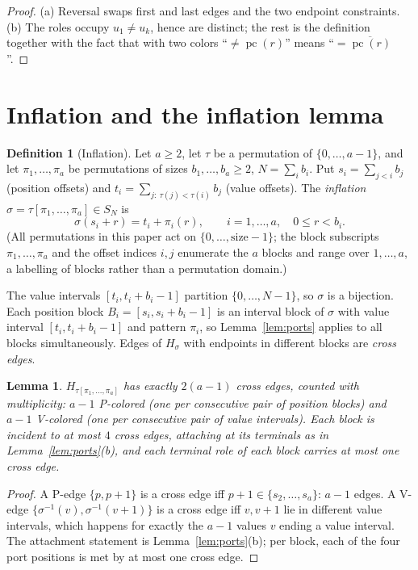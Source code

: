 \documentclass[11pt]{article}
\newtheorem{lemma}[theorem]{Lemma}
\theoremstyle{definition}
\newtheorem{definition}[theorem]{Definition}
\newcommand{\inv}[1]{#1^{-1}}
\DeclareMathOperator{\pc}{pc}
\begin{document}
\begin{proof}
(a) Reversal swaps first and last edges and the two endpoint constraints. (b) The roles
occupy $u_1 \ne u_k$, hence are distinct; the rest is the definition together with the
fact that with two colors ``$\ne\pc(r)$'' means ``$=\overline{\pc(r)}$''.
\end{proof}

\section{Inflation and the inflation lemma}\label{sec:inflation}

\begin{definition}[Inflation]\label{def:inflation}
Let $a \ge 2$, let $\tau$ be a permutation of $\{0, \dots, a-1\}$, and let
$\pi_1, \dots, \pi_a$ be permutations of sizes $b_1, \dots, b_a \ge 2$,
$N = \sum_i b_i$. Put $s_i = \sum_{j < i} b_j$ (position offsets) and
$t_i = \sum_{j:\ \tau(j) < \tau(i)} b_j$ (value offsets). The \emph{inflation}
$\sigma = \tau[\pi_1, \dots, \pi_a] \in S_N$ is
\[
\sigma(s_i + r) = t_i + \pi_i(r), \qquad i = 1, \dots, a,\quad 0 \le r < b_i .
\]
(All permutations in this paper act on $\{0, \dots, \text{size}-1\}$; the block
subscripts $\pi_1, \dots, \pi_a$ and the offset indices $i, j$ enumerate the $a$
blocks and range over $1, \dots, a$, a labelling of blocks rather than a permutation
domain.)
\end{definition}

The value intervals $[t_i, t_i + b_i - 1]$ partition $\{0, \dots, N-1\}$, so $\sigma$
is a bijection. Each position block $B_i = [s_i, s_i + b_i - 1]$ is an interval block
of $\sigma$ with value interval $[t_i, t_i + b_i - 1]$ and pattern $\pi_i$, so
Lemma~\ref{lem:ports} applies to all blocks simultaneously. Edges of $H_\sigma$ with
endpoints in different blocks are \emph{cross edges}.

\begin{lemma}\label{lem:crosscount}
$H_{\tau[\pi_1,\dots,\pi_a]}$ has exactly $2(a-1)$ cross edges, counted with
multiplicity: $a-1$ P-colored (one per consecutive pair of position blocks) and $a-1$
V-colored (one per consecutive pair of value intervals). Each block is incident to at
most $4$ cross edges, attaching at its terminals as in Lemma~\ref{lem:ports}(b), and
each terminal role of each block carries at most one cross edge.
\end{lemma}

\begin{proof}
A P-edge $\{p, p+1\}$ is a cross edge iff $p+1 \in \{s_2, \dots, s_a\}$: $a-1$ edges. A
V-edge $\{\inv\sigma(v), \inv\sigma(v+1)\}$ is a cross edge iff $v, v+1$ lie in
different value intervals, which happens for exactly the $a-1$ values $v$ ending a value
interval. The attachment statement is Lemma~\ref{lem:ports}(b); per block, each of the
four port positions is met by at most one cross edge.
\end{proof}
\end{document}
